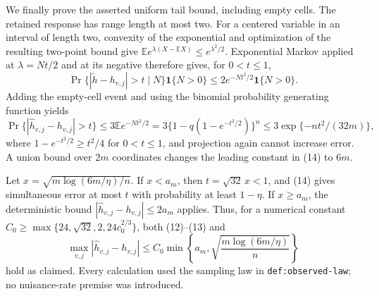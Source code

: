 We finally prove the asserted uniform tail bound, including empty cells.
The retained response has range length at most two.  For a centered variable
in an interval of length two, convexity of the exponential and optimization
of the resulting two-point bound give
\(\mathbb E e^{\lambda(X-\mathbb EX)}\le e^{\lambda^2/2}\).
Exponential Markov applied at \(\lambda=Nt/2\) and at its negative therefore
gives, for \(0<t\le1\),
\[
 \Pr\{|\widetilde h-h_{v,j}|>t\mid N\}\mathbf1\{N>0\}
 \le2e^{-Nt^2/2}\mathbf1\{N>0\}.
\]
Adding the empty-cell event and using the binomial probability generating
function yields
\[
 \Pr\{|\widehat h_{v,j}-h_{v,j}|>t\}
 \le3\mathbb E e^{-Nt^2/2}
 =3\{1-q(1-e^{-t^2/2})\}^n
 \le3\exp\{-nt^2/(32m)\},                                               \tag{14}
\]
where \(1-e^{-t^2/2}\ge t^2/4\) for \(0<t\le1\), and projection again
cannot increase error.  A union bound over \(2m\) coordinates changes the
leading constant in (14) to \(6m\).

Let \(x=\sqrt{m\log(6m/\eta)/n}\).  If \(x<a_m\), then
\(t=\sqrt{32}\,x<1\), and (14) gives simultaneous error at most \(t\)
with probability at least \(1-\eta\).  If \(x\ge a_m\), the deterministic
bound \(|\widehat h_{v,j}-h_{v,j}|\le2a_m\) applies.  Thus, for a numerical
constant \(C_0\ge\max\{24,\sqrt{32},2,24c_0^{2/3}\}\), both (12)--(13) and
\[
 \max_{v,j}|\widehat h_{v,j}-h_{v,j}|
 \le C_0\min\left\{a_m,
       \sqrt{\frac{m\log(6m/\eta)}n}\right\}
\]
hold as claimed.  Every calculation used the sampling law in
\texttt{def:observed-law}; no nuisance-rate premise was introduced.

